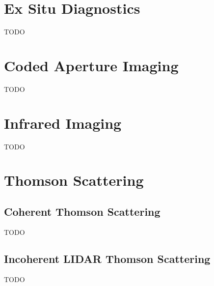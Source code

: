 \documentclass{jpp}
\begin{document}
\section{Ex Situ Diagnostics}

{\Large TODO \par}

\section{Coded Aperture Imaging}

{\Large TODO \par}

\section{Infrared Imaging}

{\Large TODO \par}

\section{Thomson Scattering}

\subsection{Coherent Thomson Scattering}

{\Large TODO \par}

\subsection{Incoherent LIDAR Thomson Scattering}

{\Large TODO \par}


 
\end{document}
